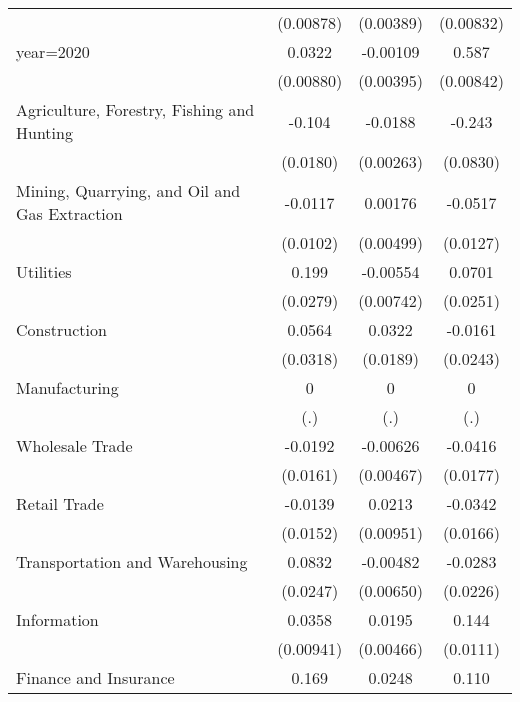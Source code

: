 {\begin{longtable}{l*{3}{c}}
                &(0.00878)         &(0.00389)         &(0.00832)         \\
year=2020       &   0.0322\sym{***}& -0.00109         &    0.587\sym{***}\\
                &(0.00880)         &(0.00395)         &(0.00842)         \\
Agriculture, Forestry, Fishing and Hunting&   -0.104\sym{***}&  -0.0188\sym{***}&   -0.243\sym{***}\\
                & (0.0180)         &(0.00263)         & (0.0830)         \\
Mining, Quarrying, and Oil and Gas Extraction&  -0.0117         &  0.00176         &  -0.0517\sym{***}\\
                & (0.0102)         &(0.00499)         & (0.0127)         \\
Utilities       &    0.199\sym{***}& -0.00554         &   0.0701\sym{***}\\
                & (0.0279)         &(0.00742)         & (0.0251)         \\
Construction    &   0.0564\sym{*}  &   0.0322\sym{*}  &  -0.0161         \\
                & (0.0318)         & (0.0189)         & (0.0243)         \\
Manufacturing   &        0         &        0         &        0         \\
                &      (.)         &      (.)         &      (.)         \\
Wholesale Trade &  -0.0192         & -0.00626         &  -0.0416\sym{**} \\
                & (0.0161)         &(0.00467)         & (0.0177)         \\
Retail Trade    &  -0.0139         &   0.0213\sym{**} &  -0.0342\sym{**} \\
                & (0.0152)         &(0.00951)         & (0.0166)         \\
Transportation and Warehousing&   0.0832\sym{***}& -0.00482         &  -0.0283         \\
                & (0.0247)         &(0.00650)         & (0.0226)         \\
Information     &   0.0358\sym{***}&   0.0195\sym{***}&    0.144\sym{***}\\
                &(0.00941)         &(0.00466)         & (0.0111)         \\
Finance and Insurance&    0.169\sym{***}&   0.0248\sym{***}&    0.110\sym{***}\\

\end{longtable}}
